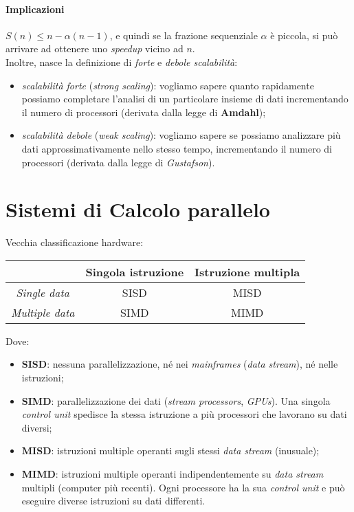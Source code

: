 \paragraph{Implicazioni}
$S(n) \leq n - \alpha (n-1)$, e quindi se la frazione sequenziale $\alpha$ è piccola, si può arrivare ad ottenere uno \textit{speedup} vicino ad $n$. \\
Inoltre, nasce la definizione di \textit{forte} e \textit{debole scalabilità}:
\begin{itemize}
	\item \textit{scalabilità forte} (\textit{strong scaling}): vogliamo sapere quanto rapidamente possiamo completare l'analisi di un particolare insieme di dati incrementando il numero di processori (derivata dalla legge di \textbf{Amdahl});
	\item \textit{scalabilità debole} (\textit{weak scaling}): vogliamo sapere se possiamo analizzare più dati approssimativamente nello stesso tempo, incrementando il numero di processori (derivata dalla legge di \textit{Gustafson}).
\end{itemize}

\section{Sistemi di Calcolo parallelo}
Vecchia classificazione hardware:
\begin{center}
	\begin{tabular}{| c | c | c |}
		\hline
		\textbf{} & \textbf{Singola istruzione} & \textbf{Istruzione multipla} \\ \hline
		\textit{Single data} & SISD & MISD \\
		\textit{Multiple data} & SIMD & MIMD \\
		\hline
	\end{tabular}
\end{center}
Dove:
\begin{itemize}
	\item \textbf{SISD}: nessuna parallelizzazione, né nei \textit{mainframes} (\textit{data stream}), né nelle istruzioni;
	\item \textbf{SIMD}: parallelizzazione dei dati (\textit{stream processors}, \textit{GPUs}). Una singola \textit{control unit} spedisce la stessa istruzione a più processori che lavorano su dati diversi;
	\item \textbf{MISD}: istruzioni multiple operanti sugli stessi \textit{data stream} (inusuale);
	\item \textbf{MIMD}: istruzioni multiple operanti indipendentemente su \textit{data stream} multipli (computer più recenti). Ogni processore ha la sua \textit{control unit} e può eseguire diverse istruzioni su dati differenti.
\end{itemize}

